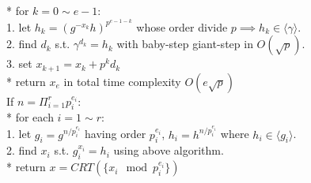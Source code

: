 \begin{itemize}[leftmargin=*]
    * for $k=0\sim e-1$:\\
    1. let $h_k=(g^{-x_k}h)^{p^{e-1-k}}$ whose order divide $p\implies h_k\in \langle\gamma\rangle$.\\
    2. find $d_k$ s.t. $\gamma^{d_k}=h_k$ with baby-step giant-step in $O(\sqrt p)$.\\
    3. set $x_{k+1}=x_k+p^kd_k$\\
    * return $x_e$ in total time complexity $O(e\sqrt p)$\\
  If $n=\Pi_{i=1}^{r}p_i^{e_i}$:\\
    * for each $i=1\sim r$:\\
    1. let $g_i=g^{n/p_i^{e_i}}$ having order $p_i^{e_i}$, $h_i=h^{n/p_i^{e_i}}$ where $h_i\in\langle g_i\rangle$.\\
    2. find $x_i$ s.t. $g_i^{x_i}=h_i$ using above algorithm.\\
    * return $x=CRT(\{x_i\mod p_i^{e_i}\})$
\end{itemize}
